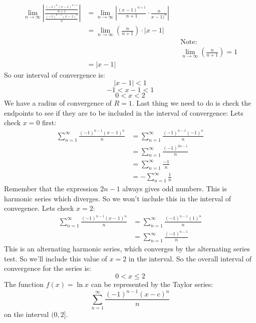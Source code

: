 \documentclass{report}
\begin{document}
        \begin{align*}
            \lim_{n \to \infty} \left| \frac{\frac{(-1)^n(x-1)^{n+1}}{n+1}}{\frac{(-1)^{n-1}(x-1)^n}{n}} \right|
            &= \lim_{n \to \infty} \left| \frac{(x-1)^{n+1}}{n+1} \cdot \frac{n}{x-1)^n} \right| \\
            &= \lim_{n \to \infty} \left( \frac{n}{n+1} \right) \cdot \left| x-1 \right| \\
            && &\text{Note:} \\
            && &\lim_{n \to \infty} \left( \frac{n}{n+1} \right) = 1 \\
            &= |x-1|
        \end{align*}
        So our interval of convergence is:
        \[|x-1| < 1\]
        \[-1 < x - 1 < 1\]
        \[0 < x < 2\]
        We have a radius of convergence of \(R = 1\).
        Last thing we need to do is check the endpoints to see if they are to be included in the interval of convergence:
        Lets check \(x = 0\) first:
        \begin{align*}
            \sum_{n = 1}^{\infty} \frac{(-1)^{n-1}(x-1)^n}{n}
            &= \sum_{n = 1}^{\infty} \frac{(-1)^{n-1}(-1)^n}{n} \\
            &= \sum_{n = 1}^{\infty} \frac{(-1)^{2n-1}}{n} \\
            &= \sum_{n = 1}^{\infty} \frac{-1}{n} \\
            &= - \sum_{n = 1}^{\infty} \frac{1}{n} 
        \end{align*}
        Remember that the expression \(2n-1\) always gives odd numbers.
        This is harmonic series which diverges.
        So we won't include this in the interval of convegence.
        Lets check \(x = 2\):
        \begin{align*}
            \sum_{n = 1}^{\infty} \frac{(-1)^{n-1}(x-1)^n}{n}
            &= \sum_{n = 1}^{\infty} \frac{(-1)^{n-1} (1)^n}{n} \\
            &= \sum_{n = 1}^{\infty} \frac{(-1)^{n-1}}{n}
        \end{align*} 
        This is an alternating harmonic series, which converges by the alternating series test.
        So we'll include this value of \(x = 2\) in the interval.
        So the overall interval of convergence for the series is:
        \[0 < x \leq 2\]
        The function \(f(x) = \ln x\) can be represented by the Taylor series:
        \[\sum_{n = 1}^{\infty} \frac{(-1)^{n-1}(x-c)^n}{n}\]
        on the interval \((0, 2]\). 
\end{document}
